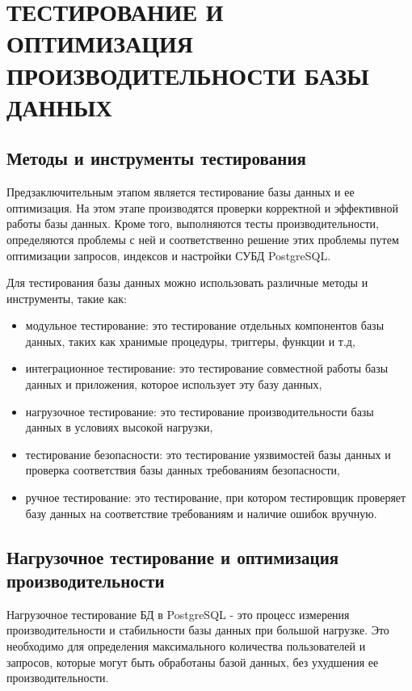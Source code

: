 \section{ТЕСТИРОВАНИЕ И ОПТИМИЗАЦИЯ ПРОИЗВОДИТЕЛЬНОСТИ БАЗЫ ДАННЫХ}

\subsection{Методы и инструменты тестирования}

Предзаключительным этапом является тестирование базы данных и ее оптимизация. На этом этапе производятся проверки корректной и эффективной работы базы данных. Кроме того, выполняются тесты производительности, определяются проблемы с ней и соответственно решение этих проблемы путем оптимизации запросов, индексов и настройки СУБД PostgreSQL.

Для тестирования базы данных можно использовать различные методы и инструменты, такие как:

\begin{itemize}
    \item модульное тестирование: это тестирование отдельных компонентов базы данных, таких как хранимые процедуры, триггеры, функции и т.д,
    \item интеграционное тестирование: это тестирование совместной работы базы данных и приложения, которое использует эту базу данных,
    \item нагрузочное тестирование: это тестирование производительности базы данных в условиях высокой нагрузки,
    \item тестирование безопасности: это тестирование уязвимостей базы данных и проверка соответствия базы данных требованиям безопасности,
    \item ручное тестирование: это тестирование, при котором тестировщик проверяет базу данных на соответствие требованиям и наличие ошибок вручную.
\end{itemize}



\subsection{Нагрузочное тестирование и оптимизация производительности}

Нагрузочное тестирование БД в PostgreSQL - это процесс измерения производительности и стабильности базы данных при большой нагрузке. Это необходимо для определения максимального количества пользователей и запросов, которые могут быть обработаны базой данных, без ухудшения ее производительности.

